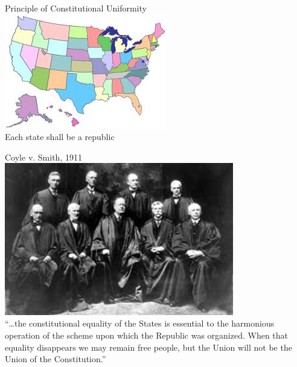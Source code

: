 \begin{frame}{Principle of Constitutional Uniformity}
    \centering
    \includegraphics[height=.7\textheight]{img/us-map.png} \\
    \huge{Each state shall be a republic} \\
\end{frame}

\begin{frame}{Coyle v. Smith, 1911}
    \centering
    \includegraphics[width=0.75\textwidth]{img/sc-1905.png} \\
    ``\ldots the constitutional equality of the States is essential to the
    harmonious operation of the scheme upon which the Republic was organized.
    When that equality disappears we may remain free people, but the Union will
    not be the Union of the Constitution.''
\end{frame}

